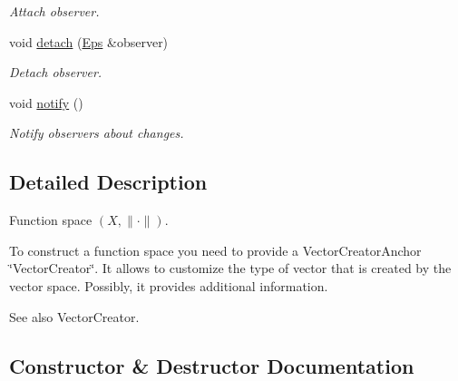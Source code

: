 \begin{DoxyCompactItemize}
\begin{DoxyCompactList}\small\item\em Attach observer. \end{DoxyCompactList}\item 
\hypertarget{classSpacy_1_1Mixin_1_1MixinConnection_adda739590c487679c26f60e50aedb73f}{}void \hyperlink{classSpacy_1_1Mixin_1_1MixinConnection_adda739590c487679c26f60e50aedb73f}{detach} (\hyperlink{classSpacy_1_1Mixin_1_1Eps_a51dbe0b9cc950e0f3dfd34a481f08ae4}{Eps} \&observer)\label{classSpacy_1_1Mixin_1_1MixinConnection_adda739590c487679c26f60e50aedb73f}

\begin{DoxyCompactList}\small\item\em Detach observer. \end{DoxyCompactList}\item 
\hypertarget{classSpacy_1_1Mixin_1_1MixinConnection_a1ddeaa78a3bb4a38c2cca36d1f99fe36}{}void \hyperlink{classSpacy_1_1Mixin_1_1MixinConnection_a1ddeaa78a3bb4a38c2cca36d1f99fe36}{notify} ()\label{classSpacy_1_1Mixin_1_1MixinConnection_a1ddeaa78a3bb4a38c2cca36d1f99fe36}

\begin{DoxyCompactList}\small\item\em Notify observers about changes. \end{DoxyCompactList}\end{DoxyCompactItemize}


\subsection{Detailed Description}
Function space $(X,\|\cdot\|)$. 

To construct a function space you need to provide a Vector\+Creator\+Anchor \char`\"{}\+Vector\+Creator\char`\"{}. It allows to customize the type of vector that is created by the vector space. Possibly, it provides additional information.

\begin{DoxySeeAlso}{See also}
Vector\+Creator. 
\end{DoxySeeAlso}


\subsection{Constructor \& Destructor Documentation}
\hypertarget{classSpacy_1_1VectorSpace_ad3006f2bbdc767590305c9f939a83c28}{}
